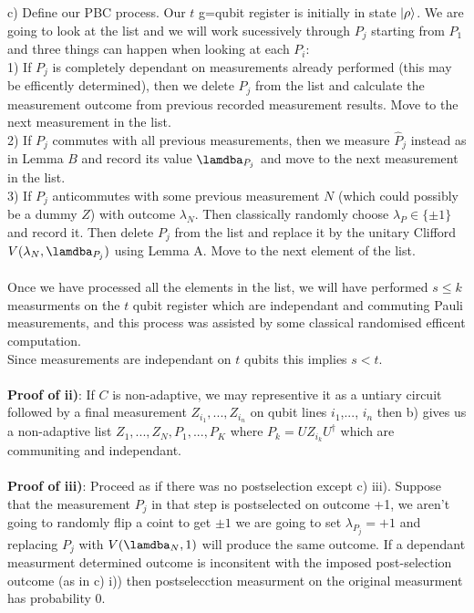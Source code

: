 \documentclass{article}
\begin{document}
c) Define our PBC process. Our $t$ g=qubit register is initially in state $\ket{\rho}$. We are going to look at the list and we will work sucessively through $P_j$ starting from $P_1$ and three things can happen when looking at each $P_i$:\\
1) If $P_j$ is completely dependant on measurements already performed (this may be efficently determined), then we delete $P_j$ from the list and calculate the measurement outcome from previous recorded measurement results. Move to the next measurement in the list.\\
2) If $P_j$ commutes with all previous measurements, then we measure $\hat P_j$ instead as in Lemma $B$ and record its value $\lamdba_{P_j}$ and move to the next measurement in the list.\\
3) If $P_j$ anticommutes with some previous measurement $N$ (which could possibly be a dummy $Z$) with outcome $\lambda_N$. Then classically randomly choose $\lambda_P \in \{ \pm 1\}$ and record it. Then delete $P_j$ from the list and replace it by the unitary Clifford $V(\lambda_N, \lamdba_{P_j})$ using Lemma A. Move to the next element of the list.\\\\
Once we have processed all the elements in the list, we will have performed $s \leq k$ measurments on the $t$ qubit register which are independant and commuting Pauli measurements, and this process was assisted by some classical randomised efficent computation. \\
Since measurements are independant on $t$ qubits this implies $s <t$.\\\\
\textbf{Proof of ii)}: If $C$ is non-adaptive, we may representive it as a untiary circuit followed by a final measurement $Z_{i_1},..., Z_{i_n}$ on qubit lines $i_1$,..., $i_n$ then b) gives us a non-adaptive list $Z_1,...,Z_N, P_1,..., P_K$ where $P_k = U Z_{i_k} U^{\dagger}$ which are communiting and independant.\\\\
\textbf{Proof of iii)}: Proceed as if there was no postselection except c) iii). Suppose that the measurement $P_j$ in that step is postselected on outcome +1, we aren't going to randomly flip a coint to get $\pm 1$ we are going to set $\lambda_{P_j} = +1$ and replacing $P_j$ with $V(\lamdba_N, 1)$ will produce the same outcome. If a dependant measurment determined outcome is inconsitent with the imposed post-selection outcome (as in c) i)) then postselecction measurment on the original measurment has probability 0.\\\\
\end{document}
